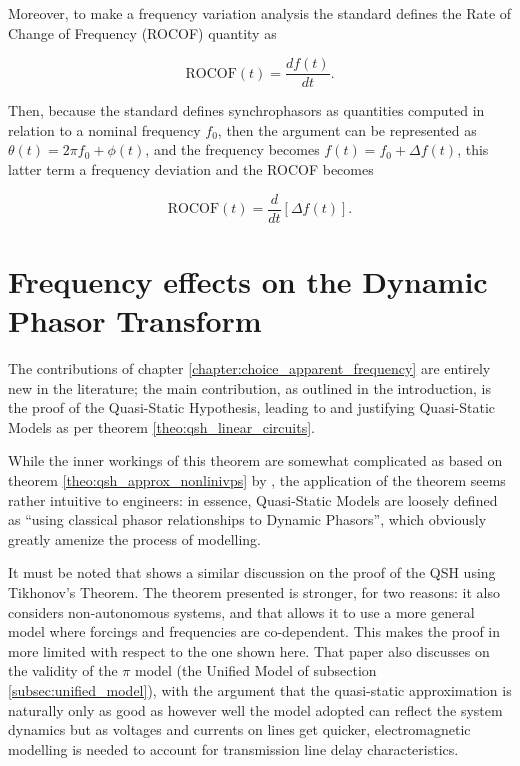 	Moreover, to make a frequency variation analysis the standard defines the Rate of Change of Frequency (ROCOF) quantity as

\begin{equation} \text{ROCOF}(t) = \dfrac{df(t)}{dt} .\end{equation}

	Then, because the standard defines synchrophasors as quantities computed in relation to a nominal frequency $f_0$, then the argument can be represented as $\theta(t) = 2\pi f_0 + \phi(t)$, and the frequency becomes $f(t) = f_0 + \Delta f(t)$, this latter term a frequency deviation and the ROCOF becomes

\begin{equation} \text{ROCOF}(t) = \dfrac{d}{dt} \left[\Delta f(t)\right].\end{equation}

\section{Frequency effects on the Dynamic Phasor Transform}%

	The contributions of chapter \ref{chapter:choice_apparent_frequency} are entirely new in the literature; the main contribution, as outlined in the introduction, is the proof of the Quasi-Static Hypothesis, leading to and justifying Quasi-Static Models as per theorem \ref{theo:qsh_linear_circuits}.

	While the inner workings of this theorem are somewhat complicated as based on theorem \ref{theo:qsh_approx_nonlinivps} by \cite{Marva2012}, the application of the theorem seems rather intuitive to engineers: in essence, Quasi-Static Models are loosely defined as ``using classical phasor relationships to Dynamic Phasors'', which obviously greatly amenize the process of modelling.

	It must be noted that \cite{Venkatasubramanian1995a} shows a similar discussion on the proof of the QSH using Tikhonov's Theorem. The theorem presented is stronger, for two reasons: it also considers non-autonomous systems, and that allows it to use a more general model where forcings and frequencies are co-dependent. This makes the proof in \cite{Venkatasubramanian1995a} more limited with respect to the one shown here. That paper also discusses on the validity of the $\pi$ model (the Unified Model of subsection \ref{subsec:unified_model}), with the argument that the quasi-static approximation is naturally only as good as however well the model adopted can reflect the system dynamics but as voltages and currents on lines get quicker, electromagnetic modelling is needed to account for transmission line delay characteristics.

